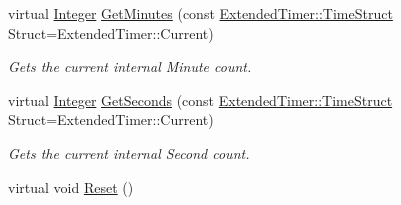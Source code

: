 \begin{DoxyCompactItemize}
virtual \hyperlink{namespaceMezzanine_ac3576e52af3c62d13dde94829e0c5465}{Integer} \hyperlink{classMezzanine_1_1ExtendedTimer_af70a43d4735bcc7d05401607c1f63784}{GetMinutes} (const \hyperlink{classMezzanine_1_1ExtendedTimer_a52119e2da54ea7ae5da0dc1f921a3b61}{ExtendedTimer::TimeStruct} Struct=ExtendedTimer::Current)
\begin{DoxyCompactList}\small\item\em Gets the current internal Minute count. \item\end{DoxyCompactList}\item 
virtual \hyperlink{namespaceMezzanine_ac3576e52af3c62d13dde94829e0c5465}{Integer} \hyperlink{classMezzanine_1_1ExtendedTimer_aa7fb648a0807f7102cb72983d6e9038f}{GetSeconds} (const \hyperlink{classMezzanine_1_1ExtendedTimer_a52119e2da54ea7ae5da0dc1f921a3b61}{ExtendedTimer::TimeStruct} Struct=ExtendedTimer::Current)
\begin{DoxyCompactList}\small\item\em Gets the current internal Second count. \item\end{DoxyCompactList}\item 
\hypertarget{classMezzanine_1_1ExtendedTimer_ac2781423c8f7d888e05443aeb5244e0a}{
virtual void \hyperlink{classMezzanine_1_1ExtendedTimer_ac2781423c8f7d888e05443aeb5244e0a}{Reset} ()}
\label{classMezzanine_1_1ExtendedTimer_ac2781423c8f7d888e05443aeb5244e0a}


\end{DoxyCompactItemize}
